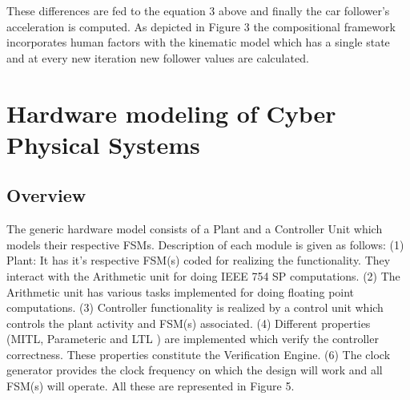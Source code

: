 {These differences are fed to the equation 3 above and finally the car follower's acceleration is computed. 
As depicted in Figure 3 the compositional framework incorporates human factors\citep{Ro2018} with the kinematic model\citep{bevrani2012evaluation} which has a single state and at every new iteration new follower values are calculated.
\section{Hardware modeling of Cyber Physical Systems}
\subsection{Overview}
The generic hardware model consists of a Plant and a Controller Unit which models their respective FSMs. Description of each module is given as follows: (1) Plant: It has it's respective FSM(s) coded for realizing the functionality. They interact with the Arithmetic unit for doing IEEE 754 SP computations. (2) The Arithmetic unit has various tasks implemented for doing floating point computations. (3) Controller functionality is realized by a control unit which controls the plant activity and FSM(s) associated.  
(4) Different properties (MITL, Parameteric and LTL ) are implemented which verify the controller correctness. These properties constitute the Verification Engine. (6) The clock generator provides the clock frequency on which the design will work and all FSM(s) will operate. All these are represented in Figure 5.
\begin{table}[]
	\centering
	\caption{Variable Update legend on state Transition}
	\label{my-label}
\end{table}}
